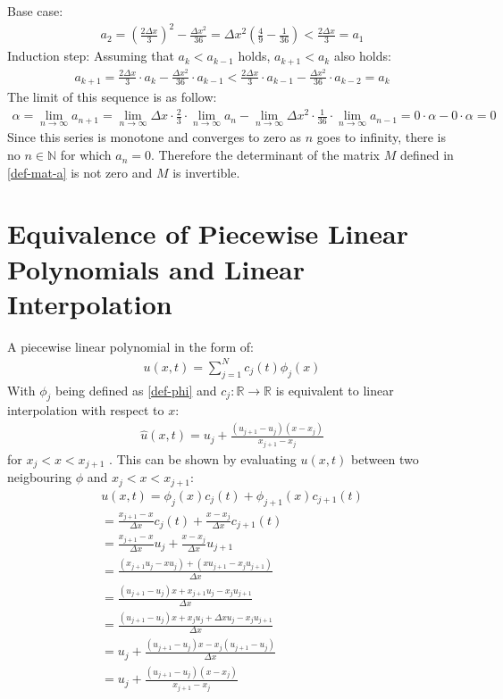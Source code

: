 Base case:
\begin{gather}
a_{2} = (\frac{2 \Delta x}{3})^{2} - \frac{\Delta x^{2}}{36} = \Delta x^{2} (\frac{4}{9} - \frac{1}{36}) < \frac{2 \Delta x}{3} = a_{1}
\end{gather}
Induction step: Assuming that \(a_k < a_{k-1}\) holds, \(a_{k+1} < a_{k}\) also holds:
\begin{gather}
a_{k+1} = \frac{2 \Delta x}{3} \cdot a_{k} - \frac{\Delta x^2}{36} \cdot a_{k-1}  < \frac{2 \Delta x}{3} \cdot a_{k-1} - \frac{\Delta x^2}{36} \cdot a_{k-2} = a_{k} 
\end{gather}
The limit of this sequence is as follow:
\begin{gather}
\alpha = \lim_{n \to \infty} a_{n+1} = \lim_{n \to \infty} \Delta x \cdot \frac{2}{3} \cdot \lim_{n \to \infty} a_{n} - \lim_{n \to \infty} \Delta x^{2} 
\cdot \frac{1}{36} \cdot \lim_{n \to \infty} a_{n-1} 
= 0 \cdot \alpha - 0 \cdot \alpha = 0
\end{gather}
Since this series is monotone and converges to zero as \(n\) goes to infinity, there is no \(n \in \mathbb{N}\) for which \(a_n = 0\). 
Therefore the determinant of the matrix \(M\) defined in \ref{def-mat-a} is not zero and \(M\) is invertible.
\section{Equivalence of Piecewise Linear Polynomials and Linear Interpolation} \label{ap-lin-interp}
A piecewise linear polynomial in the form of:
\begin{gather}
u(x, t) = \sum_{j = 1}^{N} c_{j}(t)\phi_{j}(x)
\end{gather}
With \(\phi_{j}\) being defined as \ref{def-phi} and \(c_{j}: \mathbb{R} \rightarrow \mathbb{R} \) is equivalent to linear interpolation with respect to \(x\):
\begin{gather}
\hat{u}(x,t) =  u_{j} + \frac{(u_{j+1} - u_{j})(x-x_{j})}{x_{j+1} - x_{j}} 
\end{gather}
for \(x_{j} < x < x_{j+1}\) \cite{Bayen2015}. 
This can be shown by evaluating \(u(x, t)\) between two neigbouring \(\phi\) and \(x_{j} < x < x_{j+1}\):
\begin{gather}
u(x, t) = \phi_{j}(x) c_{j}(t) + \phi_{j+1}(x) c_{j+1}(t) \\
= \frac{x_{j+1} - x}{\Delta x} c_{j}(t) + \frac{x - x_{j}}{\Delta x} c_{j+1}(t) \\
= \frac{x_{j+1} - x}{\Delta x} u_{j} + \frac{x - x_{j}}{\Delta x} u_{j+1} \\
= \frac{(x_{j+1}u_{j} - xu_{j}) + (x u_{j+1}  - x_{j} u_{j+1})}{\Delta x} \\
= \frac{(u_{j+1} - u_{j})x + x_{j+1}u_{j} - x_{j} u_{j+1}}{\Delta x} \\
= \frac{(u_{j+1} - u_{j})x + x_{j}u_{j} + \Delta x u_{j} - x_{j} u_{j+1}}{\Delta x} \\
= u_{j} + \frac{(u_{j+1} - u_{j})x - x_{j}(u_{j+1} - u_{j})}{\Delta x} \\
= u_{j} + \frac{(u_{j+1} - u_{j})(x - x_{j})}{x_{j+1} - x_{j}}
\end{gather}

